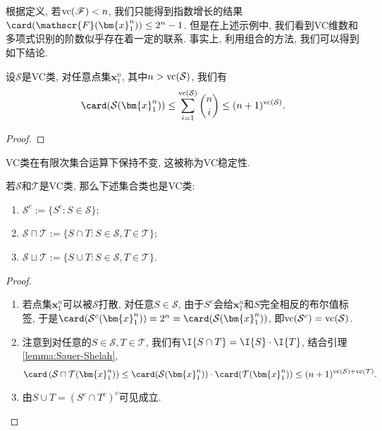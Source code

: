 根据定义, 若$\mathrm{vc}(\mathscr{F}) < n$, 我们只能得到指数增长的结果$\card(\mathscr{F}(\bm{x}_1^n)) \leq 2^n - 1$.
但是在上述示例中, 我们看到VC维数和多项式识别的阶数似乎存在着一定的联系.
事实上, 利用组合的方法, 我们可以得到如下结论. 
\begin{lemma}\label{lemma:Sauer-Shelah}
	设$\mathcal{S}$是VC类, 对任意点集$\bm{x}_1^n$, 其中$n > \mathrm{vc}(\mathcal{S})$, 我们有
	\begin{equation*}
		\card(\mathcal{S}(\bm{x}_1^n))
		\leq \sum_{i=1}^{\vc(\mathcal{S})} \binom ni
		\leq (n+1)^{\vc(\mathcal{S})}. 
	\end{equation*}
\end{lemma}
\begin{proof}
	
\end{proof}

VC类在有限次集合运算下保持不变, 这被称为VC稳定性. 
\begin{proposition}[VC稳定性]
	若$\mathcal{S}$和$\mathcal{T}$是VC类, 那么下述集合类也是VC类: 
	\begin{enumerate}[label=(\alph*)]
		\item $\mathcal{S}^c := \{S^c \colon S \in \mathcal{S}\}$;
		\item $\mathcal{S} \sqcap \mathcal{T} := \{S \cap T \colon S \in \mathcal{S}, T \in \mathcal{T}\}$;
		\item $\mathcal{S} \sqcup \mathcal{T} := \{S \cup T \colon S \in \mathcal{S}, T \in \mathcal{T}\}$.
	\end{enumerate}
\end{proposition}
\begin{proof}
	\begin{enumerate}[label=(\alph*)]
		\item 若点集$\bm{x}_1^n$可以被$\mathcal{S}$打散, 对任意$S \in \mathcal{S}$, 由于$S^c$会给$\bm{x}_1^n$和$S$完全相反的布尔值标签, 于是$\card(\mathcal{S}^c(\bm{x}_1^n)) = 2^n = \card(\mathcal{S}(\bm{x}_1^n))$, 即$\mathrm{vc}(\mathcal{S}^c) = \mathrm{vc}(\mathcal{S})$. 
		\item 注意到对任意的$S \in \mathcal{S}, T \in \mathcal{T}$, 我们有$\I{S \cap T} = \I{S} \cdot \I{T}$, 结合引理\ref{lemma:Sauer-Shelah}, 
			\begin{equation*}
				\card\left( \mathcal{S} \sqcap \mathcal{T} (\bm{x}_1^n) \right) 
				\leq \card(\mathcal{S}(\bm{x}_1^n)) \cdot \card(\mathcal{T}(\bm{x}_1^n))
				\leq (n+1)^{\vc(\mathcal{S}) + \vc(\mathcal{T})}. 
			\end{equation*}
		\item 由$S \cup T = (S^c \cap T^c)^c$可见成立. 
	\end{enumerate}
\end{proof}

